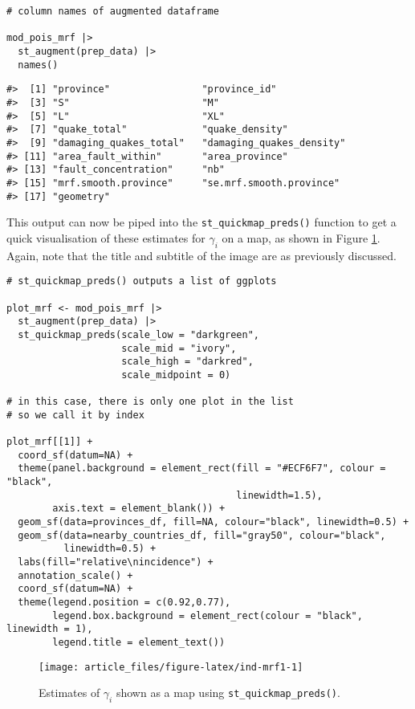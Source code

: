 \begin{verbatim}
# column names of augmented dataframe

mod_pois_mrf |> 
  st_augment(prep_data) |> 
  names()
\end{verbatim}

\begin{verbatim}
#>  [1] "province"                "province_id"            
#>  [3] "S"                       "M"                      
#>  [5] "L"                       "XL"                     
#>  [7] "quake_total"             "quake_density"          
#>  [9] "damaging_quakes_total"   "damaging_quakes_density"
#> [11] "area_fault_within"       "area_province"          
#> [13] "fault_concentration"     "nb"                     
#> [15] "mrf.smooth.province"     "se.mrf.smooth.province" 
#> [17] "geometry"
\end{verbatim}

This output can now be piped into the \texttt{st\_quickmap\_preds()} function to get a quick visualisation of
these estimates for \(\gamma_i\) on a map, as shown in Figure \ref{fig:ind-mrf1}. Again, note that the title and subtitle of the image are as previously discussed.



\begin{verbatim}
# st_quickmap_preds() outputs a list of ggplots

plot_mrf <- mod_pois_mrf |> 
  st_augment(prep_data) |>
  st_quickmap_preds(scale_low = "darkgreen",
                    scale_mid = "ivory", 
                    scale_high = "darkred", 
                    scale_midpoint = 0)

# in this case, there is only one plot in the list
# so we call it by index

plot_mrf[[1]] +
  coord_sf(datum=NA) +
  theme(panel.background = element_rect(fill = "#ECF6F7", colour = "black", 
                                        linewidth=1.5),
        axis.text = element_blank()) +
  geom_sf(data=provinces_df, fill=NA, colour="black", linewidth=0.5) + 
  geom_sf(data=nearby_countries_df, fill="gray50", colour="black", 
          linewidth=0.5) + 
  labs(fill="relative\nincidence") +
  annotation_scale() +
  coord_sf(datum=NA) + 
  theme(legend.position = c(0.92,0.77),
        legend.box.background = element_rect(colour = "black", linewidth = 1),
        legend.title = element_text())
\end{verbatim}

\begin{figure}

{\centering \texttt{[image: article\_files/figure-latex/ind-mrf1-1]} 

}

\caption{Estimates of \(\gamma_i\) shown as a map using \texttt{st\_quickmap\_preds()}.}\label{fig:ind-mrf1}
\end{figure}

